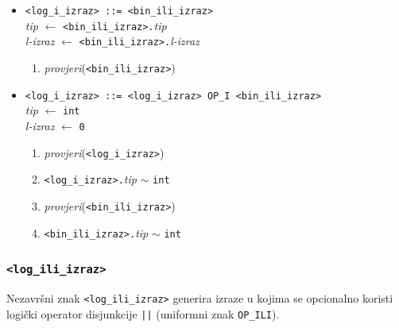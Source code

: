 \documentclass[times, 12pt, utf8]{book}
\begin{document}
\begin{itemize}

\item
\verb|<log_i_izraz> ::= <bin_ili_izraz>|\\
\emph{tip} \(\leftarrow\) \verb|<bin_ili_izraz>.|\emph{tip}\\
\emph{l-izraz} \(\leftarrow\) \verb|<bin_ili_izraz>.|\emph{l-izraz}
\begin{enumerate}
\item
\emph{provjeri}(\verb|<bin_ili_izraz>|)
\end{enumerate}

\item
\verb#<log_i_izraz> ::= <log_i_izraz> OP_I <bin_ili_izraz>#\\
\emph{tip} \(\leftarrow\) \verb|int|\\
\emph{l-izraz} \(\leftarrow\) \verb|0|
\begin{enumerate}
\item
\emph{provjeri}(\verb|<log_i_izraz>|)
\item
\verb|<log_i_izraz>.|\emph{tip} \(\sim\) \verb|int|
\item
\emph{provjeri}(\verb|<bin_ili_izraz>|)
\item
\verb|<bin_ili_izraz>.|\emph{tip} \(\sim\) \verb|int|
\end{enumerate}

\end{itemize}

\subsubsection{\texttt{<log\_ili\_izraz>}}

Nezavršni znak \verb|<log_ili_izraz>| generira izraze u kojima se opcionalno koristi logički operator disjunkcije \verb#||# (uniformni znak \verb|OP_ILI|).
\end{document}
